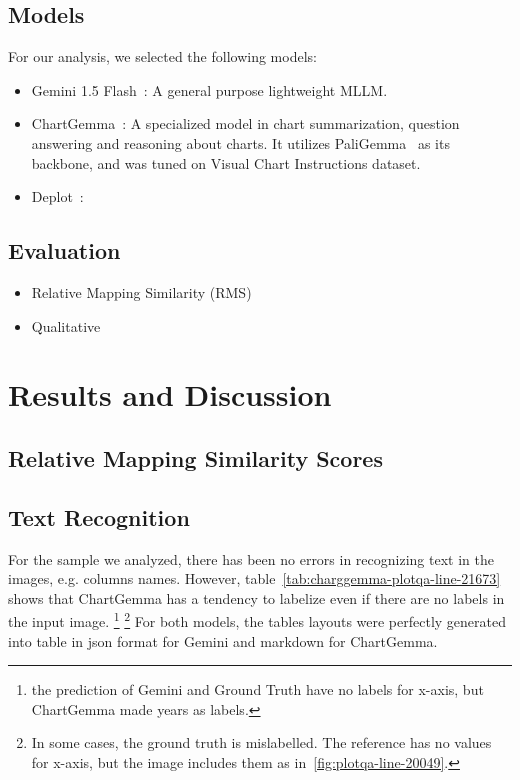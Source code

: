\documentclass[
	letterpaper, %
]{jdf}
\begin{document}
\subsection{Models}\label{ssect:models}
For our analysis, we selected the following models:
\begin{itemize}
  \item Gemini 1.5 Flash~\cite{team2024gemini}: A general purpose lightweight MLLM.
     \item ChartGemma~\cite{masry2024chartgemma}: A specialized model in chart summarization, question answering and reasoning about charts.
       It utilizes PaliGemma~\cite{beyer2024paligemma} as its backbone, and was tuned on Visual Chart Instructions dataset.
     \item Deplot~\cite{liu2022deplot}: 
       \end{itemize}
\subsection{Evaluation}
\begin{itemize}
  \item Relative Mapping Similarity (RMS)
  \item Qualitative
       \end{itemize}

\section{Results and Discussion}\label{sect:qualitative-analysis}
\subsection{Relative Mapping Similarity Scores}\label{ssect:rms}
\subsection{Text Recognition}\label{ssect:qualitative-text-recognition}
For the sample we analyzed, there has been no errors in recognizing text in the images, e.g. columns names.
However, table~\ref{tab:charggemma-plotqa-line-21673} shows that ChartGemma has a tendency to labelize even if there are no labels in the input image.
\footnote{the prediction of Gemini and Ground Truth have no labels for x-axis, but ChartGemma made years as labels.}
\footnote{In some cases, the ground truth is mislabelled. The reference has no values for x-axis, but the image includes them as in~\ref{fig:plotqa-line-20049}.}
For both models, the tables layouts were perfectly generated into table in json format for Gemini and markdown for ChartGemma.
\end{document}
